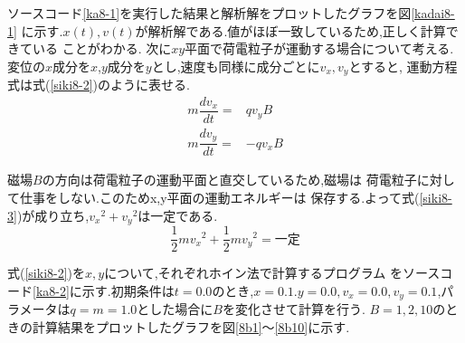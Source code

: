 ソースコード\ref{ka8-1}を実行した結果と解析解をプロットしたグラフを図\ref{kadai8-1}
に示す.$x(t),v(t)$が解析解である.値がほぼ一致しているため,正しく計算できている
ことがわかる.
次に$xy$平面で荷電粒子が運動する場合について考える.
変位の$x$成分を$x$,$y$成分を$y$とし,速度も同様に成分ごとに$v_x,v_y$とすると,
運動方程式は式(\ref{siki8-2})のように表せる.
\begin{equation}
\begin{split}
m\dfrac {dv_{x}}{dt}=&qv_{y}B\\
m\dfrac {dv_{y}}{dt}=&-qv_{x}B
\label{siki8-2}
\end{split}
\end{equation}

磁場$B$の方向は荷電粒子の運動平面と直交しているため,磁場は
荷電粒子に対して仕事をしない.このためx,y平面の運動エネルギーは
保存する.よって式(\ref{siki8-3})が成り立ち,${v_x}^2+{v_y}^2$は一定である.
\begin{equation}
\frac{1}{2}m{v_x}^2+\frac{1}{2}m{v_y}^2=一定
\label{siki8-3}
\end{equation}

式(\ref{siki8-2})を$x,y$について,それぞれホイン法で計算するプログラム
をソースコード\ref{ka8-2}に示す.初期条件は$t=0.0$のとき,$x=0.1.y=0.0,
v_x=0.0,v_y=0.1$,パラメータは$q=m=1.0$とした場合に$B$を変化させて計算を行う.
$B=1,2,10$のときの計算結果をプロットしたグラフを図\ref{8b1}～\ref{8b10}に示す.


